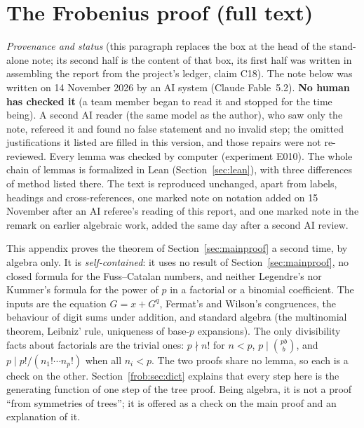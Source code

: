 \documentclass[11pt]{article}
\theoremstyle{definition}
\theoremstyle{remark}
\numberwithin{equation}{section}
\numberwithin{figure}{section}
\begin{document}
\section{The Frobenius proof (full text)}\label{app:frob}
\noindent\emph{Provenance and status} (this paragraph replaces the box at the head of the stand-alone note; its
second half is the content of that box, its first half was written in assembling the report from the
project's ledger, claim C18). The note below was written on 14 November 2026 by an AI system (Claude
Fable~5.2). \textbf{No human has checked it} (a team member began to read it and stopped for the time being).
A second AI reader (the same model as the author), who saw only
the note, refereed it and found no false statement and no invalid step; the omitted justifications it listed
are filled in this version, and those repairs were not re-reviewed. Every lemma was checked by computer
(experiment E010). The whole chain of lemmas is formalized in Lean (Section~\ref{sec:lean}), with three
differences of method listed there. The text is reproduced unchanged, apart from labels, headings and
cross-references, one marked note on notation added on 15 November after an AI referee's reading of this
report, and one marked note in the remark on earlier algebraic work, added the same day after a second AI
review.

\smallskip\noindent
This appendix proves the theorem of Section~\ref{sec:mainproof} a second time, by algebra only. It is
\emph{self-contained}: it uses no result of Section~\ref{sec:mainproof}, no closed formula for the
Fuss--Catalan numbers, and neither Legendre's nor Kummer's formula for the power of $p$ in a factorial or a
binomial coefficient. The inputs are the equation $G=x+G^q$, Fermat's and Wilson's congruences, the behaviour
of digit sums under addition, and standard algebra (the multinomial theorem, Leibniz' rule, uniqueness of
base-$p$ expansions). The only divisibility facts about factorials are the trivial ones: $p\nmid n!$ for
$n<p$, $p\mid\binom{pb}{b}$, and $p\mid p!/(n_1!\cdots n_p!)$ when all $n_i<p$. The two proofs share no
lemma, so each is a check on the other. Section~\ref{frob:sec:dict} explains that every step here is the
generating function of one step of the tree proof. Being algebra, it is not a proof ``from symmetries of
trees''; it is offered as a check on the main proof and an explanation of it.
\end{document}

